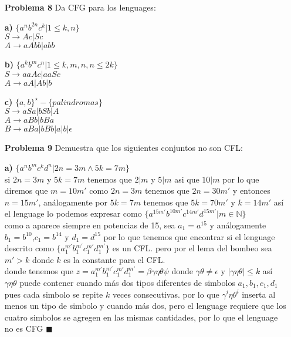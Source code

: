 \documentclass{article}
\begin{document}
\begin{enumerate}
\item[\bf{Problema 8}]  Da CFG para los lenguages:

\item[\bf{a)}]  $ \{a^{n}b^{2n}c^{k}| 1 \le k,n \}$\\
$S \rightarrow Ac|Sc $\\
$A \rightarrow aAbb|abb $

\item[\bf{b)}]  $ \{a^{k}b^{m}c^{n}| 1 \le k,m,n, n\le 2k\}$\\

$S \rightarrow aaAc|aaSc $\\
$A \rightarrow aA|Ab|b $\\

\item[\bf{c)}]  $ \{a,b\}^{\star} - \{palindromas\}$\\

$S \rightarrow aSa| bSb | A $\\
$A \rightarrow aBb| bBa $\\
$B \rightarrow aBa|bBb|a|b|\epsilon $\\


\item[\bf{Problema 9}] Demuestra que los siguientes conjuntos no son CFL:
\item[\bf{a)}]  $\{a^{n}b^{m}c^{k}d^{n}| 2n=3m \wedge 5k=7m  \}$\\
si $2n=3m$ y $5k=7m$ tenemos que $2|m$ y $5|m$ asi que $10|m$ por lo que diremos que $m=10m'$
como $2n=3m$ tenemos que $2n=30m'$ y entonces $n=15m'$, análogamente por $5k=7m$ tenemos que $5k=70m'$ y $k=14m'$
así el lenguage lo podemos expresar como $\{a^{15m'}b^{10m'}c^{14m'}d^{15m'}| m \in \mathbb{N}  \}$\\
como a aparece siempre en potencias de 15, sea $a_1=a^{15}$ y análogamente $b_1=b^{10}$,$c_1=b^{14}$ y $d_1=d^{15}$
por lo que tenemos que encontrar si el lenguage descrito como $\{a_1^{m'}b_1^{m'}c_1^{m'}d_1^{m'}\}$ es un CFL.
pero por el lema del bombeo sea $m'>k$ donde $k$ es la constante para el CFL.\\
donde tenemos que $z= a_1^{m'}b_1^{m'}c_1^{m'}d_1^{m'} = \beta \gamma \eta \theta \psi $ donde $ \gamma \theta \ne \epsilon$ y $|\gamma \eta \theta | \le k$
así $\gamma \eta \theta$ puede contener cuando más dos tipos diferentes de simbolos $a_1,b_1,c_1,d_1$ pues cada simbolo se repite $k$ veces consecutivas.
por lo que $\gamma^i \eta \theta^i$ inserta al menos un tipo de simbolo y cuando más dos, pero el lenguage requiere que los cuatro simbolos se agregen en las mismas
cantidades, por lo que el lenguage no es CFG $\blacksquare$


\end{enumerate}
\end{document}
